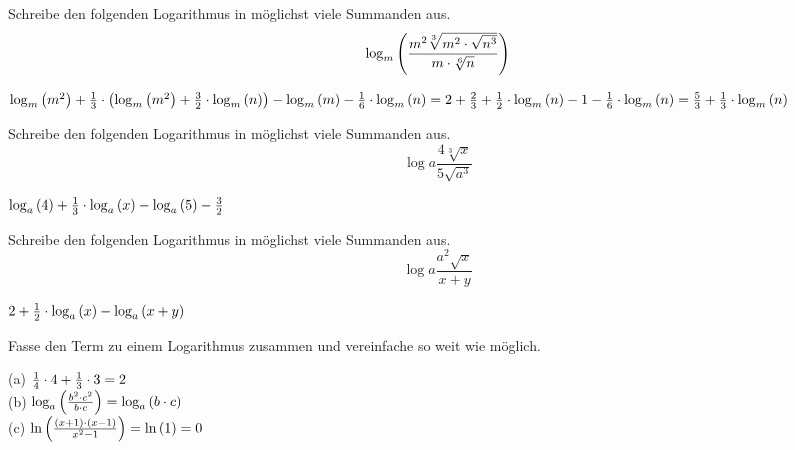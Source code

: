 \documentclass[11pt]{exam}
\begin{document}
\begin{questions}
\question[2]
Schreibe den folgenden Logarithmus in möglichst viele Summanden aus.
\[\log{m}{\frac{m^2\sqrt[3]{m^2\*\sqrt{n^3}}}{m\*\sqrt[6]{n}}}\]
{\begin{solution}
		$\log{m}{m^2}+\frac{1}{3}\*\left(\log{m}{m^2}+\frac{3}{2}\*\log{m}{n}\right)-\log{m}{m}-\frac{1}{6}\*\log{m}{n}=2+\frac{2}{3}+\frac{1}{2}\*\log{m}{n}-1-\frac{1}{6}\*\log{m}{n}=\frac{5}{3}+\frac{1}{3}\*\log{m}{n}$
\end{solution}}
{}

\question[2]
Schreibe den folgenden Logarithmus in möglichst viele Summanden aus. \[\log{a}{\frac{4\sqrt[3]{x}}{5\sqrt{a^3}}}\]
{\begin{solution}
		$\log{a}{4}+\frac{1}{3}\*\log{a}{x}-\log{a}{5}-\frac{3}{2}$
\end{solution}}
{}

\question[2]
Schreibe den folgenden Logarithmus in möglichst viele Summanden aus. \[\log{a}{\frac{a^2\sqrt{x}}{x+y}}\]
{\begin{solution}
		$2+\frac{1}{2}\*\log{a}{x}-\log{a}{x+y}$
\end{solution}}
{}


\question[6]
Fasse den Term zu einem Logarithmus zusammen und vereinfache so weit wie möglich.
{\begin{solution}
		(a) $\frac{1}{4}\cdot4+\frac{1}{3}\cdot3=2$\\
		(b) $\log{a}{\frac{b^2\*c^2}{b\*c}}=\log{a}{b\*c}$\\
		(c) $\ln{\frac{(x+1)\*(x-1)}{x^2-1}}=\ln{1}=0$
\end{solution}}
{}


\end{questions}
\end{document}
